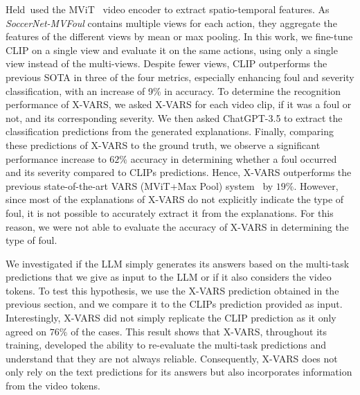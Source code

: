 Held~\etal used the MViT~\cite{li2022mvitv2, fan2021multiscale} video encoder to extract spatio-temporal features. As \textit{SoccerNet-MVFoul} contains multiple views for each action, they aggregate the features of the different views by mean or max pooling.
In this work, we fine-tune CLIP on a single view and evaluate it on the same actions, using only a single view instead of the multi-views. 
Despite fewer views, CLIP outperforms the previous SOTA in three of the four metrics, especially enhancing foul and severity classification, with an increase of 9\% in accuracy.
To determine the recognition performance of X-VARS, we asked X-VARS for each video clip, if it was a foul or not, and its corresponding severity.
We then asked ChatGPT-3.5 to extract the classification predictions from the generated explanations. 
Finally, comparing these predictions of X-VARS to the ground truth, we observe a significant performance increase to $62\%$ accuracy in determining whether a foul occurred and its severity compared to CLIPs predictions.
Hence, X-VARS outperforms the previous state-of-the-art VARS (MViT+Max Pool) system~\cite{Held2023VARS} by $19\%$. 
However, since most of the explanations of X-VARS do not explicitly indicate the type of foul, it is not possible to accurately extract it from the explanations.
For this reason, we were not able to evaluate the accuracy of X-VARS in determining the type of foul.

We investigated if the LLM simply generates its answers based on the multi-task predictions that we give as input to the LLM or if it also considers the video tokens.
To test this hypothesis, we use the X-VARS prediction obtained in the previous section, and we compare it to the CLIPs prediction provided as input. Interestingly, X-VARS did not simply replicate the CLIP prediction as it only agreed on $76\%$ of the cases.
This result shows that X-VARS, throughout its training, developed the ability to re-evaluate the multi-task predictions and understand that they are not always reliable.
Consequently, X-VARS does not only rely on the text predictions for its answers but also incorporates information from the video tokens.

